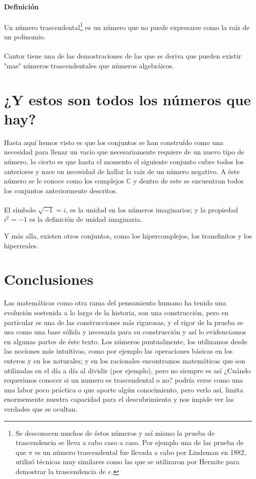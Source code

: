 \documentclass{article}
\begin{document}
\paragraph{Definición} Un número trascendental\footnote{Se desconocen muchos de éstos números y así mismo la prueba de trascendencia se lleva a cabo caso a caso. Por ejemplo una de las prueba de que $\pi$ es un número trascendental fue llevada a cabo por Lindeman en 1882, utilizó técnicas muy similares como las que se utilizaron por Hermite para demostrar la trascendencia de $e$.} es un número que no puede expresarse como la raíz de un polinomio.


\paragraph{}
Cantor tiene una de las demostraciones de las que se deriva que pueden existir "mas" números trascendentales que números algebráicos\cite{niven_1961}.

\section{¿Y estos son todos los números que hay?}

Hasta aquí hemos visto es que los conjuntos se han construído como una necesidad para llenar un vacío que necesariamente requiere de un nuevo tipo de número, lo cierto es que hasta el momento el siguiente conjunto cubre todos los anteriores y nace en necesidad de hallar la raíz de un número negativo. A éste número se le conoce como los complejos $\mathbb{C}$ y dentro de este se encuentran todos los conjuntos anteriormente descritos.

\paragraph{} El símbolo $\sqrt{-1} = i$, es la unidad en los números imaginarios; y la propiedad $i^2 = -1$ es la definición de unidad imaginaria\cite{patino_duque_1977}.

Y más alla, existen otros conjuntos, como los hipercomplejos, los transfinitos y los hiperreales.

\section{Conclusiones}
Las matemáticas como otra rama del pensamiento humano ha tenido una evolución sostenida a lo largo de la historia, son una construcción, pero en particular es una de las construcciones más rigurosas, y el rigor de la prueba se usa como una base sólida y necesaria para su construcción y así lo evidenciamos en algunas partes de éste texto. Los números puntualmente, los utilizamos desde las nociones más intuitivas, como por ejemplo las operaciones básicas en los enteros y en los naturales; y en los racionales encontramos matemáticas que son utilizadas en el día a día al dividir (por ejemplo), pero no siempre es así ¿Cuándo requerimos conocer si un numero es trascendental o no? podría verse como una una labor poco práctica o que aporte algún conocimiento, pero verlo así, limita enormemente nuestra capacidad para el descubrimiento y nos impide ver las verdades que se ocultan.

\nocite{*}


\end{document}
